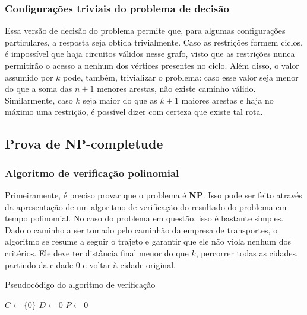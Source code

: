 \documentclass[10pt,a4paper]{article}
\numberwithin{equation}{section}
\begin{document}
\subsubsection{Configurações triviais do problema de decisão}

Essa versão de decisão do problema permite que, para algumas configurações particulares, a resposta seja obtida trivialmente. Caso as restrições formem ciclos, é impossível que haja circuitos válidos nesse grafo, visto que as restrições nunca permitirão o acesso a nenhum dos vértices presentes no ciclo. Além disso, o valor assumido por $k$ pode, também, trivializar o problema: caso esse valor seja menor do que a soma das $n + 1$ menores arestas, não existe caminho válido. Similarmente, caso $k$ seja maior do que as $k + 1$ maiores arestas e haja no máximo uma restrição, é possível dizer com certeza que existe tal rota.

\subsection{Prova de NP-completude}

\subsubsection{Algoritmo de verificação polinomial}

Primeiramente, é preciso provar que o problema é \textbf{NP}. Isso pode ser feito através da apresentação de um algoritmo de verificação do resultado do problema em tempo polinomial. No caso do problema em questão, isso é bastante simples. Dado o caminho a ser tomado pelo caminhão da empresa de transportes, o algoritmo se resume a seguir o trajeto e garantir que ele não viola nenhum dos critérios. Ele deve ter distância final menor do que $k$, percorrer todas as cidades, partindo da cidade $0$ e voltar à cidade original.

\begin{algorithm}[H]
    \DontPrintSemicolon
    \caption{Pseudocódigo do algoritmo de verificação}


    \BlankLine
    $C \gets \{0\}$ 
    $D \gets 0$ 
    $P \gets 0$ 
\end{algorithm}
\end{document}
